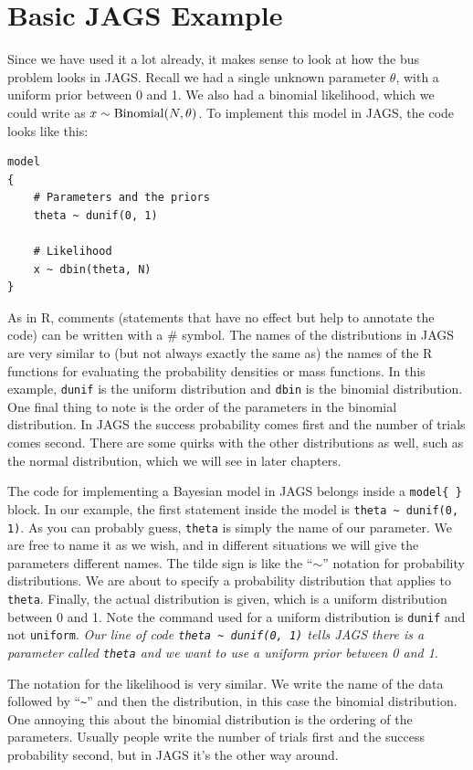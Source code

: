 \section{Basic JAGS Example}
Since we have used it a lot already, it makes sense to look at how the bus
problem looks in JAGS. Recall we had a
single unknown parameter $\theta$, with a uniform prior between 0 and 1.
We also had a binomial likelihood, which we could write as
$x \sim \textnormal{Binomial}(N, \theta)$.
To implement this model in JAGS, the code looks like this:
\begin{verbatim}
model
{
    # Parameters and the priors
    theta ~ dunif(0, 1)

    # Likelihood
    x ~ dbin(theta, N)
}
\end{verbatim}
As in R, comments (statements that have no effect but help to annotate the
code) can be written with a \# symbol.
The names of the distributions in JAGS are very similar to (but not always
exactly the same as) the names of the R functions for evaluating the probability
densities or mass functions. In this example, {\tt dunif} is the uniform
distribution and {\tt dbin} is the binomial distribution. One final thing to
note is the order of the parameters in the binomial distribution. In JAGS the
success probability comes first and the number of trials comes second.
There are some quirks with the other distributions as well, such as the normal
distribution, which we will see in later chapters.

The code for implementing a Bayesian model in JAGS belongs inside
a {\tt model\{   \}} block.
In our example,
the first statement inside the model is {\tt theta \~{ } dunif(0, 1)}. As you
can probably guess, {\tt theta}
is simply the name of our parameter. We are free to name it as we
wish, and in different situations we will give the parameters different names.
The tilde sign is like the ``$\sim$'' notation for probability distributions.
We are
about to specify a probability distribution that applies to {\tt theta}. Finally,
the actual distribution is given, which is a uniform distribution between 0 and 1. Note
the command used for a uniform distribution is {\tt dunif} and not {\tt uniform}.
{\it Our line of code {\tt theta \~{ } dunif(0, 1)}
tells JAGS
there is a parameter called {\tt theta} and we want to use a uniform prior between
0 and 1}.

The notation for the likelihood is very similar. We write the name of the data
followed by ``{\tt \~{ }}'' and then the distribution, in this case the
binomial distribution.
One annoying this about the binomial distribution is the ordering of the parameters.
Usually people write the number of trials first and the success probability
second, but in JAGS it's the other way around.

